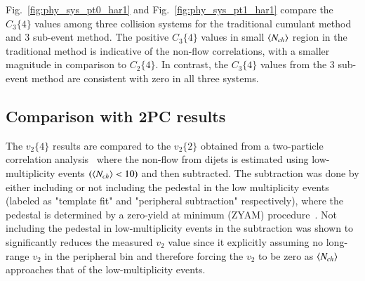 Fig.~\ref{fig:phy_sys_pt0_har1} and Fig.~\ref{fig:phy_sys_pt1_har1} compare the $C_{3}\{4\}$ values among three collision systems for the traditional cumulant method and 3 sub-event method. The positive $C_{3}\{4\}$ values in small $\left\langle N_{ch}\right\rangle$ region in the traditional method is indicative of the non-flow correlations, with a smaller magnitude in comparison to $C_{2}\{4\}$. In contrast, the $C_{3}\{4\}$ values from the 3 sub-event method are consistent with zero in all three systems.




\subsection{Comparison with 2PC results}
The $v_{2}\{4\}$ results are compared to the $v_{2}\{2\}$ obtained from a two-particle correlation analysis~\cite{Aad:2014lta, Aaboud:2016yar} where the non-flow from dijets is estimated using low-multiplicity events $(\left\langle N_{ch}\right\rangle<10)$ and then subtracted. The subtraction was done by either including or not including the pedestal in the low multiplicity events (labeled as "template fit" and "peripheral subtraction" respectively), where the pedestal is determined by a zero-yield at minimum (ZYAM) procedure~\cite{Adare:2008ae}. Not including the pedestal in low-multiplicity events in the subtraction was shown to significantly reduces the measured $v_{2}$ value since it explicitly assuming no long-range $v_{2}$ in the peripheral bin and therefore forcing the $v_{2}$ to be zero as $\left\langle N_{ch}\right\rangle$ approaches that of the low-multiplicity events.

